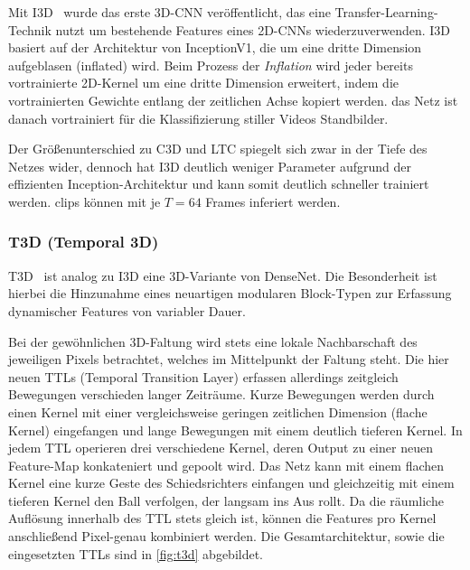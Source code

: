 Mit I3D~\cite{Carreira17} wurde das erste 3D-CNN veröffentlicht, das eine Transfer-Learning-Technik nutzt um bestehende Features eines 2D-CNNs wiederzuverwenden.
I3D basiert auf der Architektur von InceptionV1, die um eine dritte Dimension aufgeblasen (inflated) wird.
Beim Prozess der \emph{Inflation} wird jeder bereits vortrainierte 2D-Kernel um eine dritte Dimension erweitert, indem die vortrainierten Gewichte entlang der zeitlichen Achse kopiert werden.
\Dh das Netz ist danach vortrainiert für die Klassifizierung stiller Videos \bzw Standbilder.


Der Größenunterschied zu C3D und LTC spiegelt sich zwar in der Tiefe des Netzes wider, dennoch hat I3D deutlich weniger Parameter aufgrund der effizienten Inception-Architektur und kann somit deutlich schneller trainiert werden.
\glspl{clip} können mit je $T=64$ Frames inferiert werden.

\subsubsection*{T3D (Temporal 3D)}

T3D~\cite{Diba17} ist analog zu I3D eine 3D-Variante von DenseNet.
Die Besonderheit ist hierbei die Hinzunahme eines neuartigen modularen Block-Typen zur Erfassung dynamischer Features von variabler Dauer.

Bei der gewöhnlichen 3D-Faltung wird stets eine lokale Nachbarschaft des jeweiligen Pixels betrachtet, welches im Mittelpunkt der Faltung steht.
Die hier neuen TTLs (Temporal Transition Layer) erfassen allerdings zeitgleich Bewegungen verschieden langer Zeiträume.
Kurze Bewegungen werden durch einen Kernel mit einer vergleichsweise geringen zeitlichen Dimension (flache Kernel) eingefangen und lange Bewegungen mit einem deutlich tieferen Kernel.
In jedem TTL operieren drei verschiedene Kernel, deren Output zu einer neuen Feature-Map konkateniert und gepoolt wird.
Das Netz kann mit einem flachen Kernel \zB eine kurze Geste des Schiedsrichters einfangen und gleichzeitig mit einem tieferen Kernel den Ball verfolgen, der langsam ins Aus rollt.
Da die räumliche Auflösung innerhalb des TTL stets gleich ist, können die Features pro Kernel anschließend Pixel-genau kombiniert werden.
Die Gesamtarchitektur, sowie die eingesetzten TTLs sind in \autoref{fig:t3d} abgebildet.

